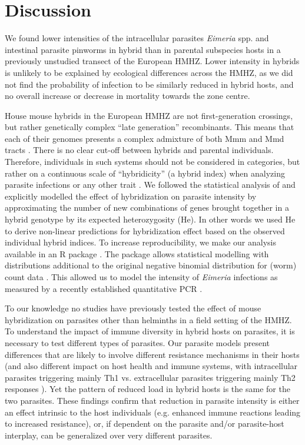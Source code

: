 \section{Discussion}
We found lower intensities of the intracellular parasites \textit{Eimeria} spp. and intestinal parasite pinworms in hybrid than in parental subspecies hosts in a previously unstudied transect of the European HMHZ. Lower intensity in hybrids is unlikely to be explained by ecological differences across the HMHZ, as we did not find the probability of infection to be similarly reduced in hybrid hosts, and no overall increase or decrease in mortality towards the zone centre. 
\par House mouse hybrids in the European HMHZ are not first-generation crossings, but rather genetically complex “late generation” recombinants. This means that each of their genomes presents a complex admixture of both Mmm and Mmd tracts \citep{macholan_genetic_2007}. There is no clear cut-off between hybrids and parental individuals. Therefore, individuals in such systems should not be considered in categories, but rather on a continuous scale of “hybridicity” (a hybrid index) when analyzing parasite infections or any other trait \citep{baird_where_2012}. We followed the statistical analysis of \cite{baird_where_2012} and explicitly modelled the effect of hybridization on parasite intensity by approximating the number of new combinations of genes brought together in a hybrid genotype by its expected heterozygosity (He). In other words we used He to derive non-linear predictions for hybridization effect based on the observed individual hybrid indices.  To increase reproducibility, we make our analysis available in an R package \citep{alice_balard_alicebalardparasiteload_2019}. The package allows statistical modelling with distributions additional to the original negative binomial distribution for (worm) count data \citep{baird_where_2012}. This allowed us to model the intensity of \textit{Eimeria} infections as measured by a recently established quantitative PCR \citep{ahmed_novel_2019, jarquin-diaz_detection_2019, al-khlifeh_eimeria_2019}.
\par To our knowledge no studies have previously tested the effect of mouse hybridization on parasites other than helminths in a field setting of the HMHZ. To understand the impact of immune diversity in hybrid hosts on parasites, it is necessary to test different types of parasites. Our parasite models present differences that are likely to involve different resistance mechanisms in their hosts (and also different impact on host health and immune systems, with intracellular parasites triggering mainly Th1 vs. extracellular parasites triggering mainly Th2 responses \citep{jankovic_th1th2_2001, maizels_parasite_1998}). Yet the pattern of reduced load in hybrid hosts is the same for the two parasites. These findings confirm that reduction in parasite intensity is either an effect intrinsic to the host individuals (e.g. enhanced immune reactions leading to increased resistance), or, if dependent on the parasite and/or parasite-host interplay, can be generalized over very different parasites. 
